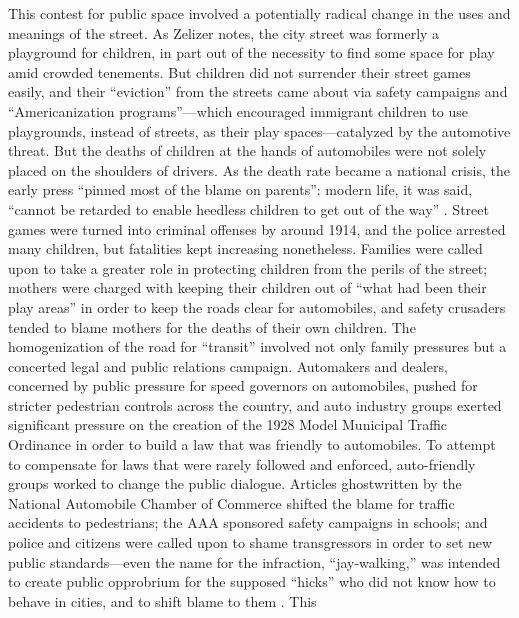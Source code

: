 This contest for public space involved a potentially radical change in
the uses and meanings of the street. As Zelizer notes, the city street
was formerly a playground for children, in part out of the necessity
to find some space for play amid crowded tenements\cite[p.
  33]{???-zelizer}. But children did not surrender their street games
easily, and their ``eviction'' from the streets came about via safety
campaigns and ``Americanization programs''---which encouraged
immigrant children to use playgrounds, instead of streets, as their
play spaces---catalyzed by the automotive threat\cite[p.
  35]{???-zelizer}. But the deaths of children at the hands of
automobiles were not solely placed on the shoulders of drivers. As the
death rate became a national crisis, the
early press ``pinned most of the blame on parents'': modern life, it
was said, ``cannot be retarded to enable heedless children to get out
of the way'' \cite[p. 37]{???-zelizer}. Street games were turned into
criminal offenses by around 1914, and the police arrested many
children, but fatalities kept increasing nonetheless\cite[p.
  38]{???-zelizer}. Families were called upon to take a greater role
in protecting children from the perils of the street; mothers were
charged with keeping their children out of ``what had been their play
areas'' in order to keep the roads clear for automobiles, and safety
crusaders tended to blame mothers for the deaths of their own
children\cite[p. 13]{???-lochlannjain}. The homogenization of the road
for ``transit'' \cite[p. 13]{???_lochlannjain} involved not only
family pressures but a concerted legal and public relations campaign. Automakers
and dealers, concerned by public pressure for speed governors on
automobiles, pushed for stricter pedestrian controls across the country, and
auto industry groups exerted significant pressure on the creation of
the 1928 Model Municipal Traffic Ordinance in order to build a law
that was friendly to automobiles\cite{???-vox}. To attempt to
compensate for laws that were rarely followed and enforced,
auto-friendly groups worked to change the public dialogue. Articles
ghostwritten by the National Automobile Chamber of Commerce shifted
the blame for traffic accidents to pedestrians; the AAA sponsored
safety campaigns in schools; and police and citizens were called upon
to shame transgressors in order to set new public standards---even the
name for the infraction, ``jay-walking,'' was intended to create
public opprobrium for the supposed ``hicks'' who did not know how to
behave in cities, and to shift blame to them \cite{???-vox}. This
